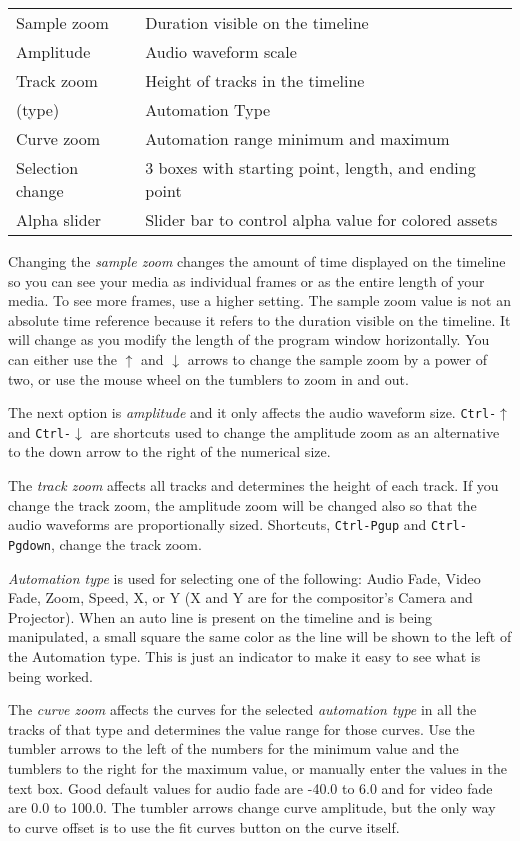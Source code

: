 \vspace{2ex}
\begin{tabular}{ l  l }
   \hline
	Sample zoom & Duration visible on the timeline \\
	Amplitude & Audio waveform scale \\
	Track zoom & Height of tracks in the timeline \\
	  (type) & Automation Type \\
	Curve zoom & Automation range minimum and maximum \\
	Selection change & 3 boxes with starting point, length, and ending point \\
	Alpha slider & Slider bar to control alpha value for colored assets \\
   \hline
\end{tabular}

Changing the \emph{sample zoom} changes the amount of time displayed on the timeline 
so you can see your media as individual frames or as the entire length of your media. 
To see more frames, use a higher setting. 
The sample zoom value is not an absolute time reference because it refers to the duration visible on the timeline. It will change as you modify the length of the program window horizontally.
You can either use the $\uparrow$ and $\downarrow$ arrows to change the sample zoom by a power of two, or use the mouse wheel on the tumblers to zoom in and out.


The next option is \emph{amplitude} and it only affects the audio waveform size. \texttt{Ctrl-$\uparrow$} and \texttt{Ctrl-$\downarrow$} are shortcuts used to change the amplitude zoom as an alternative to the down arrow to the right of the numerical size.

The \emph{track zoom} affects all tracks and determines the height of each track. 
If you change the track zoom, the amplitude zoom will be changed also so that the audio waveforms
are proportionally sized.
Shortcuts, \texttt{Ctrl-Pgup} and \texttt{Ctrl-Pgdown}, change the track zoom.

\emph{Automation type} is used for selecting one of the following: Audio Fade, Video Fade, Zoom, Speed, X, or Y (X and Y are for the compositor's Camera and Projector).  When an auto line is present on
the timeline and is being manipulated, a small square the same color as the line will be shown to 
the left of the Automation type.  This is just an indicator to make it easy to see what is being worked.
 
The \emph{curve zoom} affects the curves for the selected \emph{automation type} in all the tracks of that type and determines the value range for those curves. 
Use the tumbler arrows to the left of the numbers for the minimum value and the tumblers to the right for the maximum value, or manually enter the values in the text box. 
Good default values for audio fade are -40.0 to 6.0 and for video fade are 0.0 to 100.0. 
The tumbler arrows change curve amplitude, but the only way to curve offset is to use the fit curves button on the curve itself.

